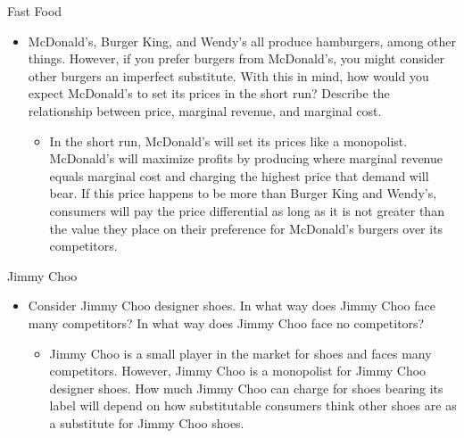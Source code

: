 \documentclass{beamer}
\begin{document}
\begin{frame}{Fast Food}
    \begin{itemize}
        \item McDonald’s, Burger King, and Wendy’s all produce hamburgers, among other things. However, if you prefer burgers from McDonald’s, you might consider other burgers an imperfect substitute. With this in mind, how would you expect McDonald’s to set its prices in the short run? Describe the relationship between price, marginal revenue, and marginal cost.
        \begin{itemize}
            \item In the short run, McDonald’s will set its prices like a monopolist. McDonald’s will maximize profits by producing where marginal revenue equals marginal cost and charging the highest price that demand will bear. If this price happens to be more than Burger King and Wendy’s, consumers will pay the price differential as long as it is not greater than the value they place on their preference for McDonald’s burgers over its competitors.
        \end{itemize}
    \end{itemize}
\end{frame}

\begin{frame}{Jimmy Choo}
    \begin{itemize}
        \item Consider Jimmy Choo designer shoes. In what way does Jimmy Choo face many competitors? In what way does Jimmy Choo face no competitors?
        \begin{itemize}
            \item Jimmy Choo is a small player in the market for shoes and faces many competitors. However, Jimmy Choo is a monopolist for Jimmy Choo designer shoes. How much Jimmy Choo can charge for shoes bearing its label will depend on how substitutable consumers think other shoes are as a substitute for Jimmy Choo shoes.
        \end{itemize}
    \end{itemize}
\end{frame}
\end{document}
